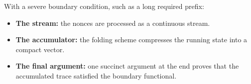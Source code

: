With a severe boundary condition, such as a long required prefix:

\begin{itemize}
\item \textbf{The stream:} the nonces are processed as a continuous stream.
\item \textbf{The accumulator:} the folding scheme compresses the running state into a compact vector.
\item \textbf{The final argument:} one succinct argument at the end proves that the accumulated trace satisfied the boundary functional.
\end{itemize}
